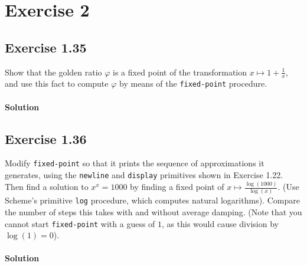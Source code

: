 \section*{Exercise 2}

\subsection*{Exercise 1.35}
Show that the golden ratio $\varphi $ is a fixed point of the transformation $ x \mapsto 1 + \frac{1}{x} $, and use this fact
to compute $\varphi $ by means of the \texttt{fixed-point} procedure.

\paragraph{Solution}


\subsection*{Exercise 1.36}
Modify \texttt{fixed-point} so that it prints the sequence of approximations it generates, using the \texttt{newline} and 
\texttt{display} primitives shown in Exercise 1.22. Then find a solution to $ x^{x} = 1000 $ by finding a fixed point of
$ x \mapsto \frac{\log(1000)}{\log(x)} $.
(Use Scheme's primitive \texttt{log} procedure, which computes natural logarithms).
Compare the number of steps this takes with and without average damping.
(Note that you cannot start \texttt{fixed-point} with a guess of $ 1 $, as this would cause division by $ \log(1) = 0 $).

\paragraph{Solution}


